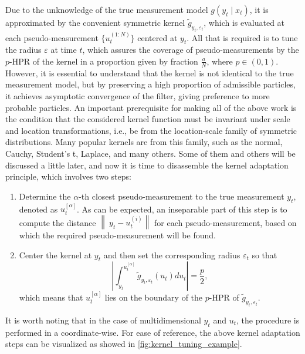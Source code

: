 Due to the unknowledge of the true measurement model \(g\left(y_t \mid x_t\right)\), it is approximated by the convenient symmetric kernel \(\tilde{g}_{y_t, \varepsilon_t}\), which is evaluated at each pseudo-measurement \(\{u_t^{(1:N)}\}\) centered at \(y_t\). All that is required is to tune the radius \(\varepsilon\) at time \(t\), which assures the coverage of pseudo-measurements by the \(p\)-HPR of the kernel in a proportion given by fraction \(\frac{a}{N}\), where \(p \in \left(0, 1\right)\). However, it is essential to understand that the kernel is not identical to the true measurement model, but by preserving a high proportion of admissible particles, it achieves asymptotic convergence of the filter, giving preference to more probable particles. An important prerequisite for making all of the above work is the condition that the considered kernel function must be invariant under scale and location transformations, i.e., be from the location-scale family of symmetric distributions. Many popular kernels are from this family, such as the normal, Cauchy, Student's t, Laplace, and many others. Some of them and others will be discussed a little later, and now it is time to disassemble the kernel adaptation principle, which involves two steps:

\begin{enumerate}
    \item Determine the \(\alpha\)-th closest pseudo-measurement to the true measurement \(y_t\), denoted as \(u_t^{[\alpha]}\). As can be expected, an inseparable part of this step is to compute the distance \(\left\lVert\ y_t - u_t^{(i)} \right\rVert\)  for each pseudo-measurement, based on which the required pseudo-measurement will be found.
    \item Center the kernel at \(y_t\) and then set the corresponding radius \(\varepsilon_t\) so that
    \begin{equation}
        \left|\int_{y_t}^{u_t^{[\alpha]}} \tilde{g}_{y_t, \varepsilon_t}\left(u_t\right) d u_t\right|=\frac{p}{2},
        \label{eq:kernel_tuning}
    \end{equation}
    which means that \(u_t^{[\alpha]}\) lies on the boundary of the \(p\)-HPR of \(\tilde{g}_{y_t, \varepsilon_t}\).
\end{enumerate}

It is worth noting that in the case of multidimensional \(y_t\) and \(u_t\), the procedure is performed in a coordinate-wise. For ease of reference, the above kernel adaptation steps can be visualized as showed in \ref{fig:kernel_tuning_example}.

